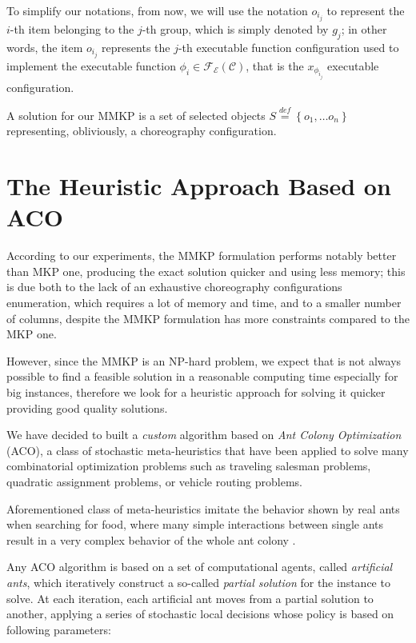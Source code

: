\documentclass[12pt,a4paper]{report}
\newcommand{\mathDef}{\overset{\textit{def}}{=}}
\begin{document}
To simplify our notations, from now, we will use the notation $o_{i_j}$ to represent the $i$-th item belonging to the $j$-th group, which is simply denoted by $g_j$; in other words, the item $o_{i_j}$ represents the $j$-th executable function configuration used to implement the executable function $\phi_i \in \mathscr{F_E}(\mathcal{C})$, that is the $x_{\phi_{i_j}}$ executable configuration.

A solution for our MMKP is a set of selected objects $S \mathDef \left\{o_{1}, \ldots o_{n} \right\}$ representing, obliviously, a choreography configuration.

\section{The Heuristic Approach Based on ACO}

According to our experiments, the MMKP formulation performs notably better than MKP one, producing the exact solution quicker and using less memory; this is due both to the lack of an exhaustive choreography configurations enumeration, which requires a lot of memory and time, and to a smaller number of columns, despite the MMKP formulation has more constraints compared to the MKP one.

However, since the MMKP is an NP-hard problem, we expect that is not always possible to find a feasible solution in a reasonable computing time especially for big instances, therefore we look for a heuristic approach for solving it quicker providing good quality solutions.

We have decided to built a \textit{custom} algorithm based on \textit{Ant Colony Optimization} (ACO), a class of stochastic meta-heuristics that have been applied to solve many combinatorial optimization problems such as traveling salesman problems, quadratic assignment problems, or vehicle routing problems.

Aforementioned class of meta-heuristics imitate the behavior shown by real ants when searching for food, where many simple interactions between single ants result in a very complex behavior of the whole ant colony \citet{acogrosso}\cite{MAXMIN}.

Any ACO algorithm is based on a set of computational agents, called \textit{artificial ants}, which iteratively construct a so-called  \textit{partial solution} for the instance to solve\citet{acogrosso}\cite{MAXMIN}. At each iteration, each artificial ant moves from a partial solution to another, applying a series of stochastic local decisions whose policy is based on following parameters:
\end{document}
